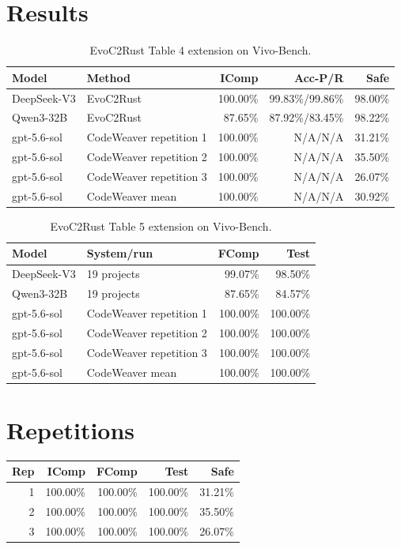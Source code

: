 \documentclass{article}
\begin{document}
\section{Results}
\begin{table}[h]\centering
\caption{EvoC2Rust Table 4 extension on Vivo-Bench.}
\begin{tabular}{llrrr}\toprule
Model & Method & IComp & Acc-P/R & Safe\\\midrule
DeepSeek-V3 & EvoC2Rust & 100.00\% & 99.83\%/99.86\% & 98.00\%\\
Qwen3-32B & EvoC2Rust & 87.65\% & 87.92\%/83.45\% & 98.22\%\\
gpt-5.6-sol & CodeWeaver repetition 1 & 100.00\% & N/A/N/A & 31.21\%\\
gpt-5.6-sol & CodeWeaver repetition 2 & 100.00\% & N/A/N/A & 35.50\%\\
gpt-5.6-sol & CodeWeaver repetition 3 & 100.00\% & N/A/N/A & 26.07\%\\
gpt-5.6-sol & CodeWeaver mean & 100.00\% & N/A/N/A & 30.92\%\\
\bottomrule\end{tabular}\end{table}
\begin{table}[h]\centering
\caption{EvoC2Rust Table 5 extension on Vivo-Bench.}
\begin{tabular}{llrr}\toprule
Model & System/run & FComp & Test\\\midrule
DeepSeek-V3 & 19 projects & 99.07\% & 98.50\%\\
Qwen3-32B & 19 projects & 87.65\% & 84.57\%\\
gpt-5.6-sol & CodeWeaver repetition 1 & 100.00\% & 100.00\%\\
gpt-5.6-sol & CodeWeaver repetition 2 & 100.00\% & 100.00\%\\
gpt-5.6-sol & CodeWeaver repetition 3 & 100.00\% & 100.00\%\\
gpt-5.6-sol & CodeWeaver mean & 100.00\% & 100.00\%\\
\bottomrule\end{tabular}\end{table}
\section{Repetitions}
\begin{tabular}{rrrrr}\toprule
Rep & IComp & FComp & Test & Safe\\\midrule
1 & 100.00\% & 100.00\% & 100.00\% & 31.21\%\\
2 & 100.00\% & 100.00\% & 100.00\% & 35.50\%\\
3 & 100.00\% & 100.00\% & 100.00\% & 26.07\%\\
\bottomrule\end{tabular}
\end{document}
